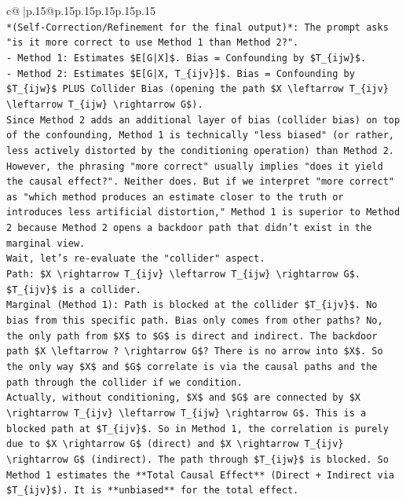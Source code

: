 \documentclass{article}
\begin{document}
{\begin{supertabular}{c@{$\;$}|p{.15\linewidth}@{}p{.15\linewidth}p{.15\linewidth}p{.15\linewidth}p{.15\linewidth}p{.15\linewidth}}
{{{\\ 
\texttt{*(Self{-}Correction/Refinement for the final output)*: The prompt asks "is it more correct to use Method 1 than Method 2?".} \\
\texttt{{-} Method 1: Estimates \$E{[}G|X{]}\$. Bias = Confounding by \$T\_\{ijw\}\$.} \\
\texttt{{-} Method 2: Estimates \$E{[}G|X, T\_\{ijv\}{]}\$. Bias = Confounding by \$T\_\{ijw\}\$ PLUS Collider Bias (opening the path \$X \textbackslash{}leftarrow T\_\{ijv\} \textbackslash{}leftarrow T\_\{ijw\} \textbackslash{}rightarrow G\$).} \\
\texttt{Since Method 2 adds an additional layer of bias (collider bias) on top of the confounding, Method 1 is technically "less biased" (or rather, less actively distorted by the conditioning operation) than Method 2. However, the phrasing "more correct" usually implies "does it yield the causal effect?". Neither does. But if we interpret "more correct" as "which method produces an estimate closer to the truth or introduces less artificial distortion," Method 1 is superior to Method 2 because Method 2 opens a backdoor path that didn't exist in the marginal view.} \\
\texttt{Wait, let's re{-}evaluate the "collider" aspect.} \\
\texttt{Path: \$X \textbackslash{}rightarrow T\_\{ijv\} \textbackslash{}leftarrow T\_\{ijw\} \textbackslash{}rightarrow G\$.} \\
\texttt{\$T\_\{ijv\}\$ is a collider.} \\
\texttt{Marginal (Method 1): Path is blocked at the collider \$T\_\{ijv\}\$. No bias from this specific path. Bias only comes from other paths? No, the only path from \$X\$ to \$G\$ is direct and indirect. The backdoor path \$X \textbackslash{}leftarrow ? \textbackslash{}rightarrow G\$? There is no arrow into \$X\$. So the only way \$X\$ and \$G\$ correlate is via the causal paths and the path through the collider if we condition.} \\
\texttt{Actually, without conditioning, \$X\$ and \$G\$ are connected by \$X \textbackslash{}rightarrow T\_\{ijv\} \textbackslash{}leftarrow T\_\{ijw\} \textbackslash{}rightarrow G\$. This is a blocked path at \$T\_\{ijv\}\$. So in Method 1, the correlation is purely due to \$X \textbackslash{}rightarrow G\$ (direct) and \$X \textbackslash{}rightarrow T\_\{ijv\} \textbackslash{}rightarrow G\$ (indirect). The path through \$T\_\{ijw\}\$ is blocked. So Method 1 estimates the **Total Causal Effect** (Direct + Indirect via \$T\_\{ijv\}\$). It is **unbiased** for the total effect.} \\
}}}
\end{supertabular}}
\end{document}
